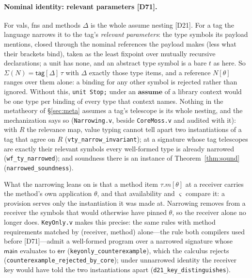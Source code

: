 \documentclass[10pt]{article}
\newcommand{\kw}[1]{\mathbf{#1}}          %
\newcommand{\ksf}[1]{\mathsf{#1}}         %
\newcommand{\smallcode}[1]{\texttt{\small #1}}
\theoremstyle{plain}
\theoremstyle{remark}
\begin{document}
\paragraph{Nominal identity: relevant parameters [D71].}
For vals, fns and methods $\Delta$ is the whole assume nesting [D21].
For a tag the language narrows it to the tag's \emph{relevant
parameters}: the type symbols its payload mentions, closed through the
nominal references the payload makes (less what their brackets bind),
taken as the least fixpoint over mutually recursive declarations; a unit
has none, and an abstract type symbol is a bare $t$ as here. So
$\Sigma(N) = \ksf{tag}[\Delta]\,\tau$ with $\Delta$ exactly those type
items, and a reference $N[\theta]$ ranges over them alone: a binding for
any other symbol is rejected rather than ignored. Without this,
\smallcode{unit Stop;} under an $\kw{assume}$ of a library context would
be one type per binding of every type that context names. Nothing in the
metatheory of \S\ref{sec:meta} assumes a tag's telescope is its whole
nesting, and the mechanization says so (\texttt{Narrowing.v}, beside
\texttt{CoreMoss.v} and audited with it): with $R$ the relevance map,
value typing cannot tell apart two instantiations of a tag that agree on
$R$ (\texttt{vty\_narrow\_invariant}); at a signature whose tag
telescopes are exactly their relevant symbols every well-formed type is
already narrowed (\texttt{wf\_ty\_narrowed}); and soundness there is an
instance of Theorem~\ref{thm:sound} (\texttt{narrowed\_soundness}).

What the narrowing leans on is that a method item $\tau.m[\theta]$ at a
receiver carries the method's own application $\theta$, and that
availability and $\varsigma$ compare it: a provision serves only the
instantiation it was made at. Narrowing removes from a receiver the
symbols that would otherwise have pinned $\theta$, so the receiver
alone no longer does. \texttt{KeyOnly.v} makes this precise: the same
rules with method requirements matched by (receiver, method) alone---the
rule both compilers used before [D71]---admit a well-formed program over
a narrowed signature whose $\ksf{main}$ evaluates to $\ksf{err}$
(\texttt{keyonly\_counterexample}), which the calculus rejects
(\texttt{counterexample\_rejected\_by\_core}); under unnarrowed
identity the receiver key would have told the two instantiations apart
(\texttt{d21\_key\_distinguishes}).
\end{document}
